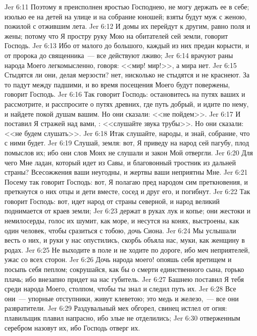 \vs Jer 6:11 Поэтому я преисполнен яростью Господнею, не могу держать ее в себе; изолью ее на детей на улице и на собрание юношей; взяты будут муж с женою, пожилой с отжившим лета.
\vs Jer 6:12 И домы их перейдут к другим, равно поля и жены; потому что Я простру руку Мою на обитателей сей земли, говорит Господь.
\vs Jer 6:13 Ибо от малого до большого, каждый из них предан корысти, и от пророка до священника~--- все действуют лживо;
\vs Jer 6:14 врачуют раны народа Моего легкомысленно, говоря: <<мир! мир!>>, а мира нет.
\vs Jer 6:15 Стыдятся ли они, делая мерзости? нет, нисколько не стыдятся и не краснеют. За то падут между падшими, и во время посещения Моего будут повержены, говорит Господь.
\rsbpar\vs Jer 6:16 Так говорит Господь: остановитесь на путях ваших и рассмотрите, и расспросите о путях древних, где путь добрый, и идите по нему, и найдете покой душам вашим. Но они сказали: <<не пойдем>>.
\vs Jer 6:17 И поставил Я стражей над вами, : <<слушайте звука трубы>>. Но они сказали: <<не будем слушать>>.
\vs Jer 6:18 Итак слушайте, народы, и знай, собрание, что с ними будет.
\vs Jer 6:19 Слушай, земля: вот, Я приведу на народ сей пагубу, плод помыслов их; ибо они слов Моих не слушали и закон Мой отвергли.
\vs Jer 6:20 Для чего Мне ладан, который идет из Савы, и благовонный тростник из дальней страны? Всесожжения ваши неугодны, и жертвы ваши неприятны Мне.
\vs Jer 6:21 Посему так говорит Господь: вот, Я полагаю пред народом сим преткновения, и преткнутся о них отцы и дети вместе, сосед и друг его, и погибнут.
\rsbpar\vs Jer 6:22 Так говорит Господь: вот, идет народ от страны северной, и народ великий поднимается от краев земли;
\vs Jer 6:23 держат в руках лук и копье; они жестоки и немилосерды, голос их шумит, как море, и несутся на конях, выстроены, как один человек, чтобы сразиться с тобою, дочь Сиона.
\vs Jer 6:24 Мы услышали весть о них, и руки у нас опустились, скорбь объяла нас, муки, как женщину в родах.
\vs Jer 6:25 Не выходите в поле и не ходите по дороге, ибо меч неприятелей, ужас со всех сторон.
\vs Jer 6:26 Дочь народа моего! опояшь себя вретищем и посыпь себя пеплом; сокрушайся, как бы о смерти единственного сына, горько плачь; ибо внезапно придет на нас губитель.
\vs Jer 6:27 Башнею поставил Я тебя среди народа Моего, столпом, чтобы ты знал и следил путь их.
\vs Jer 6:28 Все они~--- упорные отступники, живут клеветою; это медь и железо,~--- все они развратители.
\vs Jer 6:29 Раздувальный мех обгорел, свинец истлел от огня: плавильщик плавил напрасно, ибо злые не отделились;
\vs Jer 6:30 отверженным серебром назовут их, ибо Господь отверг их.
